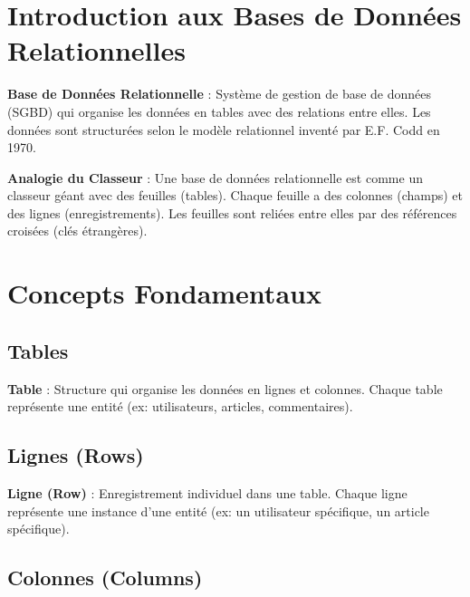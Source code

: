 \section{Introduction aux Bases de Données Relationnelles}

\begin{definitionbox}
    \textbf{Base de Données Relationnelle} : Système de gestion de base de données (SGBD) qui organise les données en tables avec des relations entre elles. Les données sont structurées selon le modèle relationnel inventé par E.F. Codd en 1970.
\end{definitionbox}

\begin{analogybox}
    \textbf{Analogie du Classeur} : Une base de données relationnelle est comme un classeur géant avec des feuilles (tables). Chaque feuille a des colonnes (champs) et des lignes (enregistrements). Les feuilles sont reliées entre elles par des références croisées (clés étrangères).
\end{analogybox}

\section{Concepts Fondamentaux}

\subsection{Tables}

\begin{definitionbox}
    \textbf{Table} : Structure qui organise les données en lignes et colonnes. Chaque table représente une entité (ex: utilisateurs, articles, commentaires).
\end{definitionbox}

\subsection{Lignes (Rows)}

\begin{definitionbox}
    \textbf{Ligne (Row)} : Enregistrement individuel dans une table. Chaque ligne représente une instance d'une entité (ex: un utilisateur spécifique, un article spécifique).
\end{definitionbox}

\subsection{Colonnes (Columns)}

